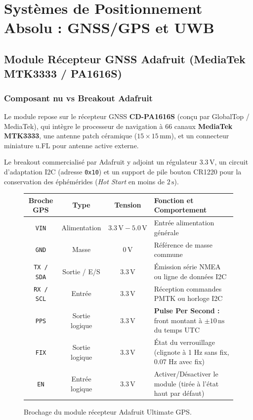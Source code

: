 \documentclass[../Materiel.tex]{subfiles}
\begin{document}
\section{Systèmes de Positionnement Absolu : GNSS/GPS et UWB}

\subsection{Module Récepteur GNSS Adafruit (MediaTek MTK3333 / PA1616S)}

\subsubsection{Composant nu vs Breakout Adafruit}
Le module repose sur le récepteur GNSS \textbf{CD-PA1616S} (conçu par GlobalTop / MediaTek), qui intègre le processeur de navigation à 66 canaux \textbf{MediaTek MTK3333}, une antenne patch céramique ($15 \times 15\,\text{mm}$), et un connecteur miniature u.FL pour antenne active externe.

Le breakout commercialisé par Adafruit y adjoint un régulateur $3.3\,\text{V}$, un circuit d'adaptation I2C (adresse \texttt{0x10}) et un support de pile bouton CR1220 pour la conservation des éphémérides (\textit{Hot Start} en moins de $2\,\text{s}$).

\begin{figure}[htbp]
\centering
\small
\begin{tabular}{|c|c|c|l|}
\hline
\textbf{Broche GPS} & \textbf{Type} & \textbf{Tension} & \textbf{Fonction et Comportement} \\
\hline
\texttt{VIN} & Alimentation & $3.3\,\text{V} - 5.0\,\text{V}$ & Entrée alimentation générale \\
\texttt{GND} & Masse & $0\,\text{V}$ & Référence de masse commune \\
\texttt{TX / SDA} & Sortie / E/S & $3.3\,\text{V}$ & Émission série NMEA ou ligne de données I2C \\
\texttt{RX / SCL} & Entrée & $3.3\,\text{V}$ & Réception commandes PMTK ou horloge I2C \\
\texttt{PPS} & Sortie logique & $3.3\,\text{V}$ & \textbf{Pulse Per Second :} front montant à $\pm 10\,\text{ns}$ du temps UTC \\
\texttt{FIX} & Sortie logique & $3.3\,\text{V}$ & État du verrouillage (clignote à 1 Hz sans fix, 0.07 Hz avec fix) \\
\texttt{EN} & Entrée logique & $3.3\,\text{V}$ & Activer/Désactiver le module (tirée à l'état haut par défaut) \\
\hline
\end{tabular}
\caption{Brochage du module récepteur Adafruit Ultimate GPS.}
\end{figure}
\end{document}
